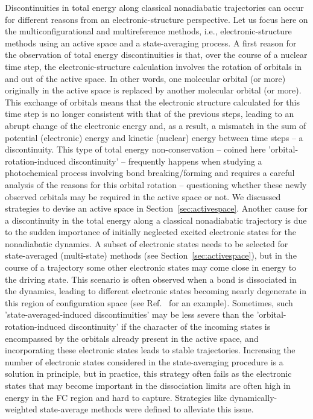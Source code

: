 \documentclass[9pt,bestpractices]{livecoms}
\begin{document}
Discontinuities in total energy along classical nonadiabatic trajectories can occur for different reasons from an electronic-structure perspective. Let us focus here on the multiconfigurational and multireference methods, i.e., electronic-structure methods using an active space and a state-averaging process. A first reason for the observation of total energy discontinuities is that, over the course of a nuclear time step, the electronic-structure calculation involves the rotation of orbitals in and out of the active space. In other words, one molecular orbital (or more) originally in the active space is replaced by another molecular orbital (or more). This exchange of orbitals means that the electronic structure calculated for this time step is no longer consistent with that of the previous steps, leading to an abrupt change of the electronic energy and, as a result, a mismatch in the sum of potential (electronic) energy and kinetic (nuclear) energy between time steps -- a discontinuity. This type of total energy non-conservation -- coined here 'orbital-rotation-induced discontinuity' -- frequently happens when studying a photochemical process involving bond breaking/forming and requires a careful analysis of the reasons for this orbital rotation -- questioning whether these newly observed orbitals may be required in the active space or not. We discussed strategies to devise an active space in Section~\ref{sec:activespace}. Another cause for a discontinuity in the total energy along a classical nonadiabatic trajectory is due to the sudden importance of initially neglected excited electronic states for the nonadiabatic dynamics. A subset of electronic states needs to be selected for state-averaged (multi-state) methods (see Section~\ref{sec:activespace}), but in the course of a trajectory some other electronic states may come close in energy to the driving state. This scenario is often observed when a bond is dissociated in the dynamics, leading to different electronic states becoming nearly degenerate in this region of configuration space (see Ref.~ for an example). Sometimes, such 'state-averaged-induced discontinuities' may be less severe than the 'orbital-rotation-induced discontinuity' if the character of the incoming states is encompassed by the orbitals already present in the active space, and incorporating these electronic states leads to stable trajectories. Increasing the number of electronic states considered in the state-averaging procedure is a solution in principle, but in practice, this strategy often fails as the electronic states that may become important in the dissociation limits are often high in energy in the FC region and hard to capture. Strategies like dynamically-weighted state-average methods were defined to alleviate this issue.\cite{glover2019analytical, 
battaglia2020extended, 
li2019dynamically} 
\end{document}
